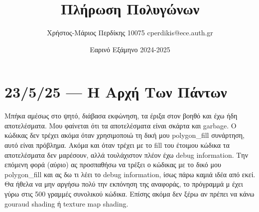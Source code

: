 \documentclass{article}
\title{Πλήρωση Πολυγώνων}
\date{Εαρινό Εξάμηνο 2024-2025}
\author{Χρήστος-Μάριος Περδίκης 10075 cperdikis@ece.auth.gr}
\begin{document}
\maketitle
\section{23/5/25 --- Η Αρχή Των Πάντων}
Μπήκα αμέσως στο ψητό, διάβασα εκφώνηση, τα έριξα στον βοηθό και έχω ήδη 
αποτελέσματα. Μου φαίνεται ότι τα αποτελέσματα είναι σκάρτα και garbage.
Ο κώδικας δεν τρέχει ακόμα όταν χρησιμοποιώ τη δική μου polygon_fill 
συνάρτηση, αυτό είναι πρόβλημα. Ακόμα και όταν τρέχει με το fill του
έτοιμου κώδικα τα αποτελέσματα δεν μαρέσουν, αλλά τουλάχιστον πλέον έχω 
debug information. Την επόμενη φορά (αύριο) ας προσπαθήσω να τρέξει ο
κώδικας με το δικό μου polygon_fill και ας δω τι λέει το debug information,
ίσως πάρω καμιά ιδέα από εκεί. Θα ήθελα να μην αργήσω πολύ την εκπόνηση της 
αναφοράς, το πρόγραμμά μ έχει γύρω στις 500 γραμμές συνολικού κώδικα. Επίσης
ακόμα δεν ξέρω αν πρέπει να κάνω gouraud shading ή texture map shading.
\end{document}
